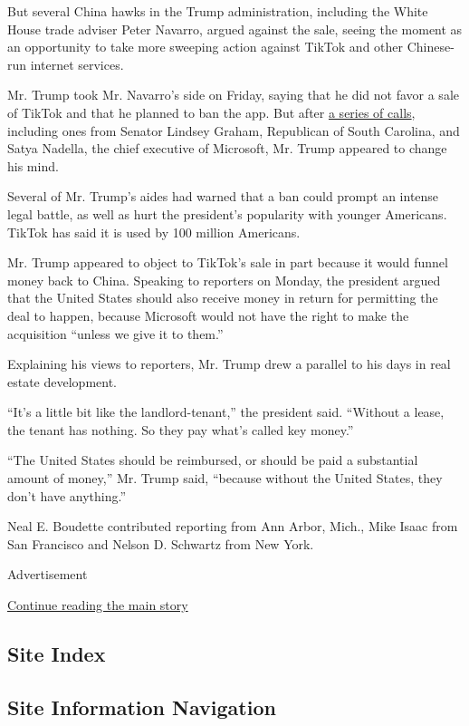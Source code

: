 But several China hawks in the Trump administration, including the White
House trade adviser Peter Navarro, argued against the sale, seeing the
moment as an opportunity to take more sweeping action against TikTok and
other Chinese-run internet services.

Mr. Trump took Mr. Navarro's side on Friday, saying that he did not
favor a sale of TikTok and that he planned to ban the app. But after
\href{https://www.nytimes3xbfgragh.onion/2020/08/02/business/economy/trump-tiktok-china-national-security.html}{a
series of calls}, including ones from Senator Lindsey Graham, Republican
of South Carolina, and Satya Nadella, the chief executive of Microsoft,
Mr. Trump appeared to change his mind.

Several of Mr. Trump's aides had warned that a ban could prompt an
intense legal battle, as well as hurt the president's popularity with
younger Americans. TikTok has said it is used by 100 million Americans.

Mr. Trump appeared to object to TikTok's sale in part because it would
funnel money back to China. Speaking to reporters on Monday, the
president argued that the United States should also receive money in
return for permitting the deal to happen, because Microsoft would not
have the right to make the acquisition ``unless we give it to them.''

Explaining his views to reporters, Mr. Trump drew a parallel to his days
in real estate development.

``It's a little bit like the landlord-tenant,'' the president said.
``Without a lease, the tenant has nothing. So they pay what's called key
money.''

``The United States should be reimbursed, or should be paid a
substantial amount of money,'' Mr. Trump said, ``because without the
United States, they don't have anything.''

Neal E. Boudette contributed reporting from Ann Arbor, Mich., Mike Isaac
from San Francisco and Nelson D. Schwartz from New York.

Advertisement

\protect\hyperlink{after-bottom}{Continue reading the main story}

\hypertarget{site-index}{%
\subsection{Site Index}\label{site-index}}

\hypertarget{site-information-navigation}{%
\subsection{Site Information
Navigation}\label{site-information-navigation}}

